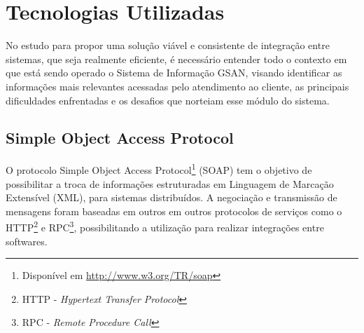 



\section{Tecnologias Utilizadas}

No estudo para propor uma solução viável e consistente de integração entre sistemas, que seja realmente eficiente, é necessário entender todo o contexto em que está sendo operado o Sistema de Informação GSAN, visando identificar as informações mais relevantes acessadas pelo atendimento ao cliente, as principais dificuldades enfrentadas e os desafios que norteiam esse módulo do sistema. 



\subsection{Simple Object Access Protocol}
O protocolo Simple Object Access Protocol\footnote{Disponível em  \url{http://www.w3.org/TR/soap}} (SOAP) tem o objetivo de possibilitar a troca de informações estruturadas em Linguagem de Marcação Extensível (XML), para sistemas distribuídos. A negociação e transmissão de mensagens foram baseadas em outros em outros protocolos de serviços como o HTTP\footnote{HTTP - \textit{Hypertext Transfer Protocol}}  e RPC\footnote{RPC - \textit{Remote Procedure Call}}, possibilitando a utilização para realizar integrações entre softwares.

